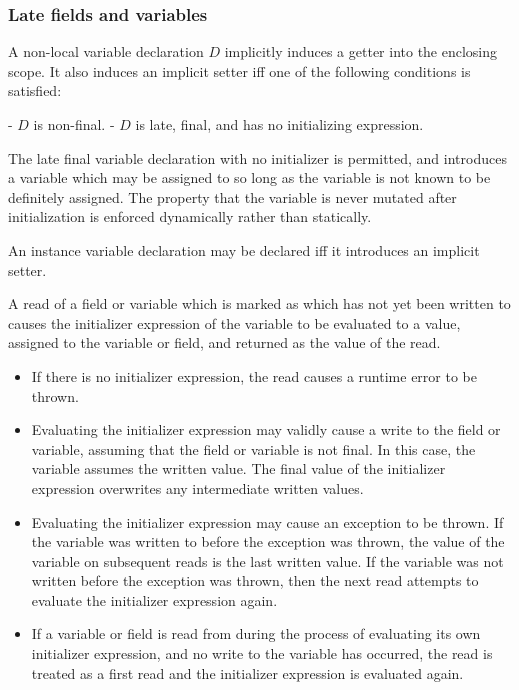 \documentclass[makeidx]{article}
\begin{document}
{

\subsubsection{Late fields and variables}

A non-local \LATE{} variable declaration $D$ implicitly induces a getter
into the enclosing scope.  It also induces an implicit setter iff one of the
following conditions is satisfied:

  - $D$ is non-final.
  - $D$ is late, final, and has no initializing expression.

The late final variable declaration with no initializer is permitted, and
introduces a variable which may be assigned to so long as the variable is not
known to be definitely assigned.  The property that the variable is never
mutated after initialization is enforced dynamically rather than statically.

An instance variable declaration may be declared \COVARIANT{} iff it introduces
an implicit setter.

A read of a field or variable which is marked as \LATE{} which has not yet been
written to causes the initializer expression of the variable to be evaluated to
a value, assigned to the variable or field, and returned as the value of the
read.

\begin{itemize}
\item If there is no initializer expression, the read causes a runtime error to be
    thrown.
\item Evaluating the initializer expression may validly cause a write to the field
    or variable, assuming that the field or variable is not final.  In this
    case, the variable assumes the written value.  The final value of the
    initializer expression overwrites any intermediate written values.
\item Evaluating the initializer expression may cause an exception to be thrown.
    If the variable was written to before the exception was thrown, the value of
    the variable on subsequent reads is the last written value.  If the variable
    was not written before the exception was thrown, then the next read attempts
    to evaluate the initializer expression again.
\item If a variable or field is read from during the process of evaluating its own
    initializer expression, and no write to the variable has occurred, the read
    is treated as a first read and the initializer expression is evaluated
    again.
\end{itemize}

}
\end{document}

